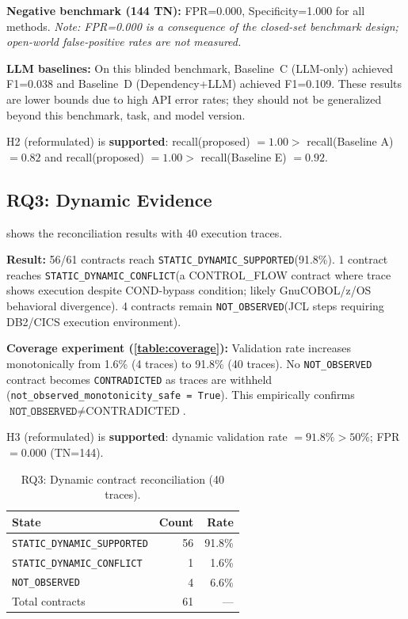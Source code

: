 \documentclass[sigconf,anonymous,review]{acmart}
\newcommand{\notobs}{\texttt{NOT\_OBSERVED}\xspace}
\newcommand{\supported}{\texttt{STATIC\_DYNAMIC\_SUPPORTED}\xspace}
\newcommand{\conflict}{\texttt{STATIC\_DYNAMIC\_CONFLICT}\xspace}
\begin{document}
\textbf{Negative benchmark (144 TN):}
FPR=0.000, Specificity=1.000 for all methods.
\textit{Note: FPR=0.000 is a consequence of the closed-set benchmark design;
open-world false-positive rates are not measured.}

\textbf{LLM baselines:}
On this blinded benchmark, Baseline~C (LLM-only) achieved F1=0.038 and Baseline~D
(Dependency+LLM) achieved F1=0.109.
These results are lower bounds due to high API error rates; they should not be
generalized beyond this benchmark, task, and model version.

H2 (reformulated) is \textbf{supported}:
recall(proposed) $= 1.00 >$ recall(Baseline A) $= 0.82$ and recall(proposed) $= 1.00 >$
recall(Baseline E) $= 0.92$.



\subsection{RQ3: Dynamic Evidence}

 shows the reconciliation results with 40 execution traces.

\textbf{Result:}
56/61 contracts reach \supported (91.8\%).
1 contract reaches \conflict (a CONTROL\_FLOW contract where trace shows execution
despite COND-bypass condition; likely GnuCOBOL/z/OS behavioral divergence).
4 contracts remain \notobs (JCL steps requiring DB2/CICS execution environment).

\textbf{Coverage experiment (\cref{table:coverage}):}
Validation rate increases monotonically from 1.6\% (4 traces) to 91.8\% (40 traces).
No \notobs contract becomes \texttt{CONTRADICTED} as traces are withheld
(\texttt{not\_observed\_monotonicity\_safe = True}).
This empirically confirms $\notobs \neq \text{CONTRADICTED}$.

H3 (reformulated) is \textbf{supported}: dynamic validation rate $= 91.8\% > 50\%$;
FPR $= 0.000$ (TN=144).

\begin{table}[t]
\small\centering
\caption{RQ3: Dynamic contract reconciliation (40 traces).}\label{table:rq3}
\begin{tabular}{lrr}
\toprule
State & Count & Rate \\
\midrule
\texttt{STATIC\_DYNAMIC\_SUPPORTED} & 56 & 91.8\% \\
\texttt{STATIC\_DYNAMIC\_CONFLICT}  & 1  & 1.6\%  \\
\texttt{NOT\_OBSERVED}              & 4  & 6.6\%  \\
\midrule
Total contracts & 61 & — \\
\bottomrule
\end{tabular}
\end{table}
\end{document}
